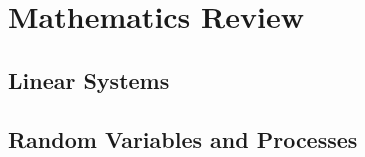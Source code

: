 \documentclass[mphy386-notes.tex]{subfiles}
\begin{document}
\section{Mathematics Review}
\subsection{Linear Systems}
\subsection{Random Variables and Processes}
\pagebreak
\end{document}
